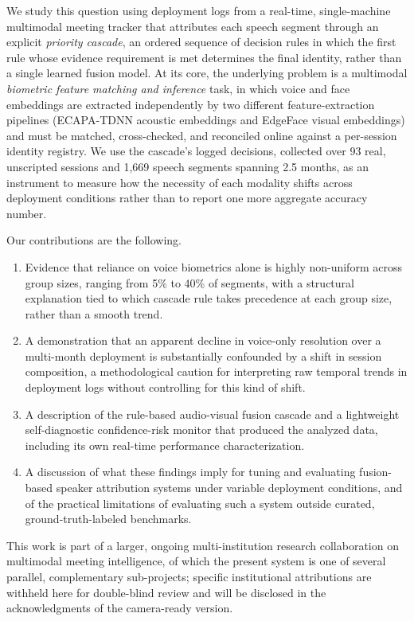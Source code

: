 \documentclass[conference,a4paper]{IEEEtran}
\begin{document}
We study this question using deployment logs from a real-time,
single-machine multimodal meeting tracker that attributes each speech
segment through an explicit \emph{priority cascade}, an ordered
sequence of decision rules in which the first rule whose evidence
requirement is met determines the final identity, rather than a single
learned fusion model. At its core, the underlying problem is a
multimodal \emph{biometric feature matching and inference} task, in
which voice and face embeddings are extracted independently by two
different feature-extraction pipelines (ECAPA-TDNN acoustic embeddings
and EdgeFace visual embeddings) and must be matched, cross-checked, and
reconciled online against a per-session identity registry. We use the
cascade's logged decisions, collected over 93 real, unscripted sessions
and 1{,}669 speech segments spanning 2.5 months, as an instrument to
measure how the necessity of each modality shifts across deployment
conditions rather than to report one more aggregate accuracy number.

Our contributions are the following.

\begin{enumerate}
\item Evidence that reliance on voice biometrics alone is highly
non-uniform across group sizes, ranging from 5\% to 40\% of segments,
with a structural explanation tied to which cascade rule takes
precedence at each group size, rather than a smooth trend.
\item A demonstration that an apparent decline in voice-only
resolution over a multi-month deployment is substantially confounded
by a shift in session composition, a methodological caution for
interpreting raw temporal trends in deployment logs without
controlling for this kind of shift.
\item A description of the rule-based audio-visual fusion cascade and
a lightweight self-diagnostic confidence-risk monitor that produced
the analyzed data, including its own real-time performance
characterization.
\item A discussion of what these findings imply for tuning and
evaluating fusion-based speaker attribution systems under variable
deployment conditions, and of the practical limitations of evaluating
such a system outside curated, ground-truth-labeled benchmarks.
\end{enumerate}

This work is part of a larger, ongoing multi-institution research
collaboration on multimodal meeting intelligence, of which the present
system is one of several parallel, complementary sub-projects; specific
institutional attributions are withheld here for double-blind review
and will be disclosed in the acknowledgments of the camera-ready
version.
\end{document}
